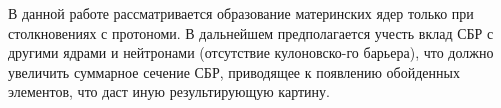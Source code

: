 \documentclass[14pt, a4paper]{article}
\numberwithin{figure}{section}
\numberwithin{equation}{section}
\begin{document}
В данной работе рассматривается образование материнских ядер только при столкновениях с протономи. В дальнейшем предполагается учесть вклад СБР с другими ядрами и нейтронами (отсутствие кулоновско-го барьера), что должно увеличить суммарное сечение СБР, приводящее к появлению обойденных элементов, что даст иную результирующую картину.

\newpage
{}


\end{document}
